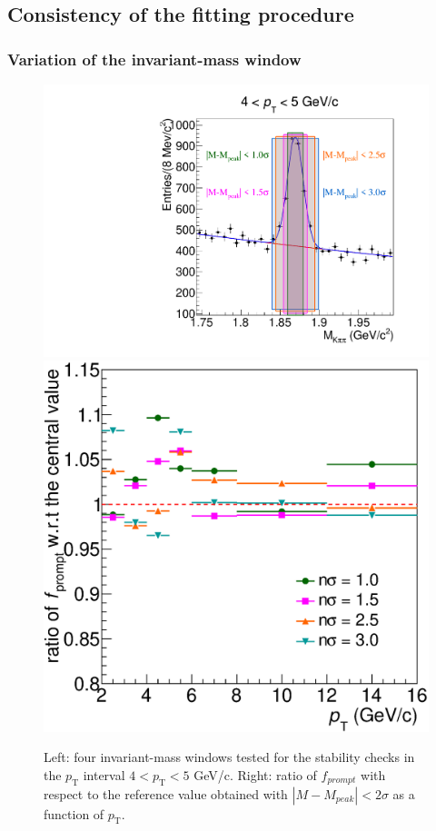 \documentclass[b5paper,10pt,twoside,oldstyle,classica]{toptesi}
\newcommand{\pt}{p_\text{T}}
\begin{document}
\subsection{Consistency of the fitting procedure}
\subsubsection{Variation of the invariant-mass window}
\begin{figure}[b]
\begin{center}
{\includegraphics[scale = 0.32]{Mass_4-5_ranges.pdf}}
\hspace{-0.6cm}
{\includegraphics[scale = 0.32]{promptfraction_syst_MassRange_onlyratio.eps}}
\caption{Left: four invariant-mass windows tested for the stability checks in the $\pt$ interval $4<\pt<5$ GeV/c. Right: ratio of $f_{prompt}$ with respect to the reference value obtained with $|M-M_{peak}|<2\sigma$ as a function of $\pt$.}
\label{masswindow_syst}
\end{center}
\end{figure}
\end{document}
